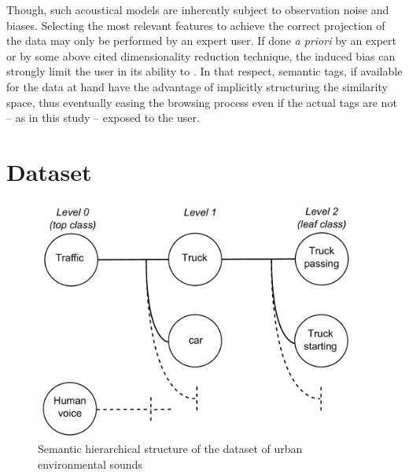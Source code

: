 \documentclass{aes2e}
\begin{document}
Though, such acoustical models are inherently subject to observation noise and biases. Selecting the most relevant features to achieve the correct projection of the data may only be performed by an expert user. If done \textit{a priori} by an expert or by some above cited dimensionality reduction technique, the induced bias can strongly limit the user in its ability to . In that respect, semantic tags, if available for the data at hand have the advantage of implicitly structuring the similarity space, thus eventually easing the browsing process even if the actual tags are not -- as in this study -- exposed to the user.

\section{Dataset} \label{dataset}


\begin{figure}[t]
\begin{center}
\includegraphics[scale=0.24]{gfx/dataset.pdf} 
\end{center}
\caption{\label{figdataset} Semantic hierarchical structure of the dataset of urban environmental sounds}
\end{figure}
\end{document}
